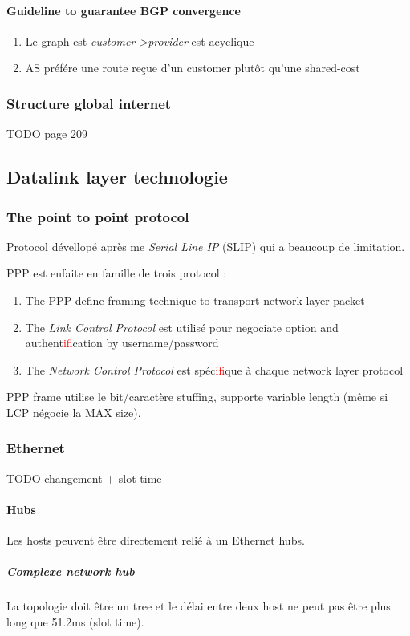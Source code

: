 \paragraph{Guideline to guarantee BGP convergence}
\begin{enumerate}
    \item Le graph est \textit{customer->provider} est acyclique
    \item AS préfére une route reçue d'un customer plutôt qu'une shared-cost
\end{enumerate}

\subsubsection{Structure global internet}
TODO page 209

\subsection{Datalink layer technologie}

\subsubsection{The point to point protocol}
Protocol dévellopé après me \textit{Serial Line IP} (SLIP) qui a beaucoup de limitation.

PPP est enfaite en famille de trois protocol :
\begin{enumerate}
    \item The PPP define framing technique to transport network layer packet
    \item The \textit{Link Control Protocol} est utilisé pour negociate option and authent\textcolor{red}{if}ication by username/password
    \item The \textit{Network Control Protocol} est spéc\textcolor{red}{if}ique à chaque network layer protocol
\end{enumerate}

PPP frame utilise le bit/caractère stuffing, supporte variable length (même si LCP négocie la MAX size).

\subsubsection{Ethernet}
TODO changement + slot time

\paragraph{Hubs}
Les hosts peuvent être directement relié à un Ethernet hubs.
\subparagraph{Complexe network hub} La topologie doit être un tree et le délai entre
deux host ne peut pas être plus long que 51.2ms (slot time).

